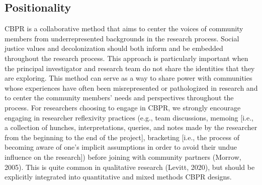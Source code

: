 \documentclass[
  11pt,
]{book}
\begin{document}
\hypertarget{positionality}{%
\subsection{Positionality}\label{positionality}}

CBPR is a collaborative method that aims to center the voices of community members from underrepresented backgrounds in the research process. Social justice values and decolonization should both inform and be embedded throughout the research process. This approach is particularly important when the principal investigator and research team do not share the identities that they are exploring. This method can serve as a way to share power with communities whose experiences have often been misrepresented or pathologized in research and to center the community members' needs and perspectives throughout the process. For researchers choosing to engage in CBPR, we strongly encourage engaging in researcher reflexivity practices (e.g., team discussions, memoing {[}i.e., a collection of hunches, interpretations, queries, and notes made by the researcher from the beginning to the end of the project{]}, bracketing {[}i.e., the process of becoming aware of one's implicit assumptions in order to avoid their undue influence on the research{]}) before joining with community partners (Morrow, 2005). This is quite common in qualitative research (Levitt, 2020), but should be explicitly integrated into quantitative and mixed methods CBPR designs.
\end{document}
